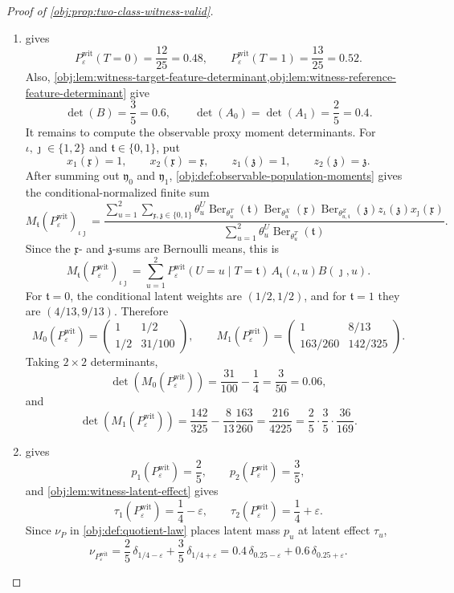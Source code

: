 \documentclass[11pt]{article}
\begin{document}
\begin{proof}[Proof of \cref{obj:prop:two-class-witness-valid}]
\begin{enumerate}
\item {} gives
\[
P_{\varepsilon}^{\mathrm{wit}}(T=0)=\frac{12}{25}=0.48,\qquad
P_{\varepsilon}^{\mathrm{wit}}(T=1)=\frac{13}{25}=0.52 .
\]
Also, \cref{obj:lem:witness-target-feature-determinant,obj:lem:witness-reference-feature-determinant} give
\[
\det(B)=\frac35=0.6,\qquad
\det(A_0)=\det(A_1)=\frac25=0.4 .
\]
It remains to compute the observable proxy moment determinants.  For \(\iota,\jmath\in\{1,2\}\) and
\(\mathfrak t\in\{0,1\}\), put
\[
x_1(\mathfrak x)=1,\qquad x_2(\mathfrak x)=\mathfrak x,\qquad
z_1(\mathfrak z)=1,\qquad z_2(\mathfrak z)=\mathfrak z .
\]
After summing out \(\mathfrak y_0\) and \(\mathfrak y_1\), \cref{obj:def:observable-population-moments} gives the conditional-normalized finite sum
\[
M_{\mathfrak t}(P_{\varepsilon}^{\mathrm{wit}})_{\iota\jmath}
=
\frac{
\sum_{u=1}^{2}\sum_{\mathfrak x,\mathfrak z\in\{0,1\}}
\theta^U_u\operatorname{Ber}_{\theta^T_u}(\mathfrak t)
\operatorname{Ber}_{\theta^X_u}(\mathfrak x)
\operatorname{Ber}_{\theta^Z_{u,\mathfrak t}}(\mathfrak z)
z_\iota(\mathfrak z)x_\jmath(\mathfrak x)}
{\sum_{u=1}^{2}\theta^U_u\operatorname{Ber}_{\theta^T_u}(\mathfrak t)} .
\]
Since the \(\mathfrak x\)- and \(\mathfrak z\)-sums are Bernoulli means, this is
\[
M_{\mathfrak t}(P_{\varepsilon}^{\mathrm{wit}})_{\iota\jmath}
=
\sum_{u=1}^{2}
P_{\varepsilon}^{\mathrm{wit}}(U=u\mid T=\mathfrak t)\,
A_{\mathfrak t}(\iota,u)B(\jmath,u).
\]
For \(\mathfrak t=0\), the conditional latent weights are \((1/2,1/2)\), and for
\(\mathfrak t=1\) they are \((4/13,9/13)\).  Therefore
\[
M_0(P_{\varepsilon}^{\mathrm{wit}})
=
\begin{pmatrix}
1&1/2\\[2pt]
1/2&31/100
\end{pmatrix},
\qquad
M_1(P_{\varepsilon}^{\mathrm{wit}})
=
\begin{pmatrix}
1&8/13\\[2pt]
163/260&142/325
\end{pmatrix}.
\]
Taking \(2\times2\) determinants,
\[
\det(M_0(P_{\varepsilon}^{\mathrm{wit}}))
=
\frac{31}{100}-\frac14
=
\frac3{50}
=
0.06,
\]
and
\[
\det(M_1(P_{\varepsilon}^{\mathrm{wit}}))
=
\frac{142}{325}-\frac8{13}\frac{163}{260}
=
\frac{216}{4225}
=
\frac25\cdot\frac35\cdot\frac{36}{169}.
\] %

\item {} gives
\[
p_1(P_{\varepsilon}^{\mathrm{wit}})=\frac25,\qquad
p_2(P_{\varepsilon}^{\mathrm{wit}})=\frac35,
\]
and \cref{obj:lem:witness-latent-effect} gives
\[
\tau_1(P_{\varepsilon}^{\mathrm{wit}})=\frac14-\varepsilon,\qquad
\tau_2(P_{\varepsilon}^{\mathrm{wit}})=\frac14+\varepsilon .
\]
Since \(\nu_P\) in \cref{obj:def:quotient-law} places latent mass \(p_u\) at latent effect \(\tau_u\),
\[
\nu_{P_{\varepsilon}^{\mathrm{wit}}}
=
\frac25\,\delta_{1/4-\varepsilon}
+
\frac35\,\delta_{1/4+\varepsilon}
=
0.4\,\delta_{0.25-\varepsilon}
+
0.6\,\delta_{0.25+\varepsilon}.
\] %


\end{enumerate}
\end{proof}
\end{document}
